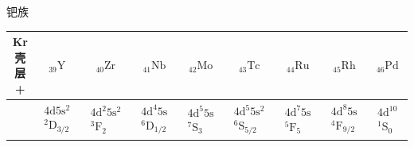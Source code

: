 \begin{center}
\vspace{0.8em}
钯\quad 族\\[0.5em]
\begin{tabular}{|c||c|c|c|c|c|c|c|c|}
\hline
Kr 壳层+ & ${}_{39}\mathrm{Y}$ & ${}_{40}\mathrm{Zr}$ & ${}_{41}\mathrm{Nb}$ & ${}_{42}\mathrm{Mo}$ & ${}_{43}\mathrm{Tc}$ & ${}_{44}\mathrm{Ru}$ & ${}_{45}\mathrm{Rh}$ & ${}_{46}\mathrm{Pd}$\\
\hline
 & $\begin{array}{c}4\mathrm{d}5\mathrm{s}^{2}\\{}^{2}\mathrm{D}_{3/2}\end{array}$ &
$\begin{array}{c}4\mathrm{d}^{2}5\mathrm{s}^{2}\\{}^{3}\mathrm{F}_{2}\end{array}$ &
$\begin{array}{c}4\mathrm{d}^{4}5\mathrm{s}\\{}^{6}\mathrm{D}_{1/2}\end{array}$ &
$\begin{array}{c}4\mathrm{d}^{5}5\mathrm{s}\\{}^{7}\mathrm{S}_{3}\end{array}$ &
$\begin{array}{c}4\mathrm{d}^{5}5\mathrm{s}^{2}\\{}^{6}\mathrm{S}_{5/2}\end{array}$ &
$\begin{array}{c}4\mathrm{d}^{7}5\mathrm{s}\\{}^{5}\mathrm{F}_{5}\end{array}$ &
$\begin{array}{c}4\mathrm{d}^{8}5\mathrm{s}\\{}^{4}\mathrm{F}_{9/2}\end{array}$ &
$\begin{array}{c}4\mathrm{d}^{10}\\{}^{1}\mathrm{S}_{0}\end{array}$\\
\hline
\end{tabular}


\end{center}

